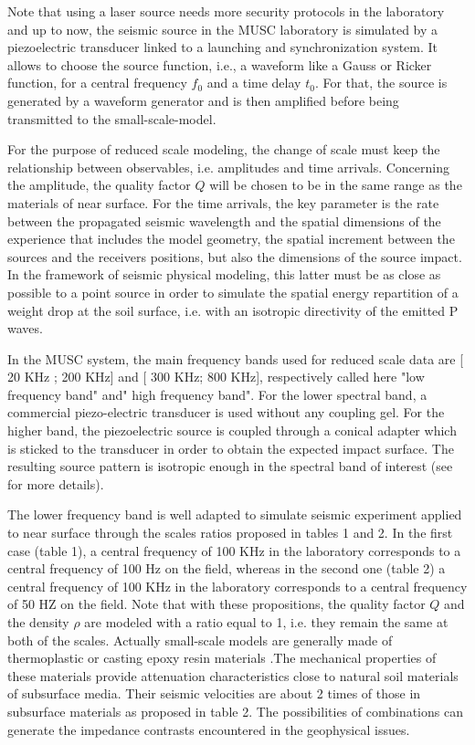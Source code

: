 \documentclass[manuscript,revised]{geophysics}
\begin{document}
\noindent Note that using a laser source needs more security protocols in the laboratory and up to now, the seismic source in the MUSC laboratory is simulated by a piezoelectric transducer linked to a launching and synchronization system. It allows to choose the source function, i.e., a waveform like a Gauss or Ricker function, for a central frequency $f_{0}$ and a time delay $t_{0}$. For that, the source is generated by a waveform generator and is then amplified before being transmitted to the small-scale-model.

\noindent For the purpose of reduced scale modeling, the change of scale must keep the relationship between observables, i.e. amplitudes and time arrivals. Concerning the amplitude, the quality factor $Q$ will be chosen to be in the same range as the materials of near surface. For the time arrivals, the key parameter is the rate between the propagated seismic wavelength and the spatial dimensions of the experience that includes the model geometry, the spatial increment between the sources and the receivers positions, but also the dimensions of the source impact. In the framework of seismic physical modeling, this latter must be as close as possible to a point source in order to simulate the spatial energy repartition of a weight drop at the soil surface, i.e. with an isotropic directivity of the emitted P waves.

\noindent In the MUSC system, the main frequency bands used for reduced scale data are [ 20 KHz ; 200 KHz] and [ 300 KHz; 800 KHz], respectively called here "low frequency band" and" high frequency band". For the lower spectral band, a commercial piezo-electric transducer is used without any coupling gel. For the higher band, the piezoelectric source is coupled through a conical adapter which is sticked to the transducer in order to obtain the expected impact surface. The resulting source pattern is isotropic enough in the spectral band of interest (see \citep{Bretaudeau_SSM_2011} for more details).

\noindent The lower frequency band is well adapted to simulate seismic experiment applied to near surface through the scales ratios proposed in tables 1 and 2. In the first case (table 1), a central frequency of 100 KHz in the laboratory corresponds to a central frequency of 100 Hz on the field, whereas in the second one (table 2) a central frequency of 100 KHz in the laboratory corresponds to a central frequency of 50 HZ on the field. Note that with these propositions, the  quality factor $Q$ and the density $\rho$ are modeled with a ratio equal to 1, i.e. they remain the same at both of the scales. Actually small-scale models are generally made of thermoplastic or casting epoxy resin materials \citep{Bretaudeau_FWI_2013}.The mechanical properties of these materials provide attenuation characteristics close to natural soil materials of subsurface media. Their seismic velocities are about 2 times of those in subsurface materials as proposed in table 2. The possibilities of combinations can generate the impedance contrasts encountered in the geophysical issues. 
\end{document}
